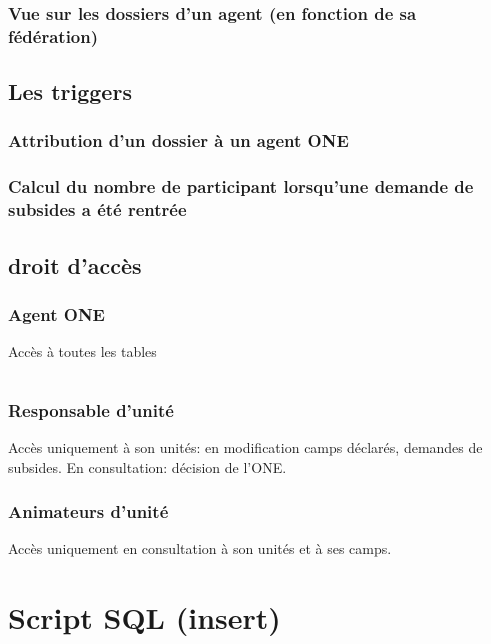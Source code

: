\subsubsection{Vue sur les dossiers d'un agent (en fonction de sa fédération)}








\subsection{Les triggers}
\subsubsection{Attribution d'un dossier à un agent ONE}

\subsubsection{Calcul du nombre de participant lorsqu'une demande de subsides a été rentrée}




\subsection{droit d'accès}
\subsubsection{Agent ONE}
Accès à toutes les tables
\inputminted[breaklines =true, autogobble, linenos, frame = single]{sql}{Codes/code_role_agent_one.tex}



\subsubsection{Responsable d'unité}
Accès uniquement à son unités: en modification camps déclarés, demandes de subsides. En consultation: décision de l'ONE. 



\subsubsection{Animateurs d'unité}
Accès uniquement en consultation à son unités et à ses camps. 










\section{Script SQL (insert)}


